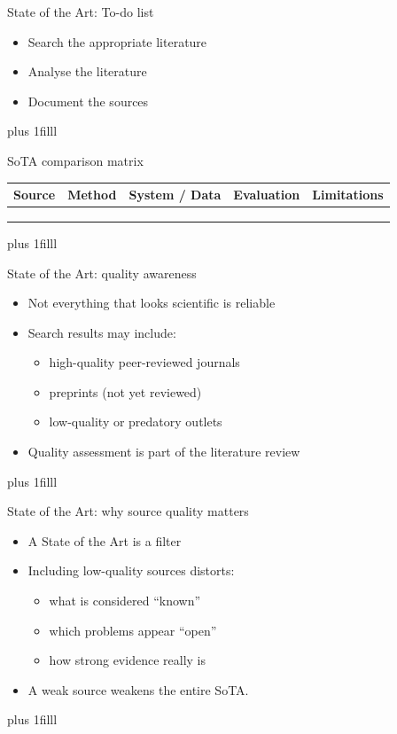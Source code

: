 \documentclass[aspectratio=169]{beamer}
\newcommand{\btVFill}{\vskip0pt plus 1filll}
\begin{document}
\begin{frame}{State of the Art: To-do list}
  \begin{itemize}
    \item Search the appropriate literature
    \item Analyse the literature
    \item Document the sources
  \end{itemize}
  \btVFill
\end{frame}

\begin{frame}{SoTA comparison matrix}
\small
\begin{tabular}{p{2.6cm} p{2.2cm} p{2.2cm} p{2.4cm} p{2.4cm}}
\toprule
\textbf{Source} &
\textbf{Method} &
\textbf{System / Data} &
\textbf{Evaluation} &
\textbf{Limitations} \\
\midrule
 &  &  &  &  \\
 &  &  &  &  \\
 &  &  &  &  \\
\bottomrule
\end{tabular}
\btVFill
\end{frame}

\begin{frame}{State of the Art: quality awareness}
  \begin{itemize}
    \item Not everything that looks scientific is reliable
    \item Search results may include:
      \begin{itemize}
        \item high-quality peer-reviewed journals
        \item preprints (not yet reviewed)
        \item low-quality or predatory outlets
      \end{itemize}
    \item Quality assessment is part of the literature review
  \end{itemize}
  \btVFill
\end{frame}

\begin{frame}{State of the Art: why source quality matters}
  \begin{itemize}
    \item A State of the Art is a filter
    \item Including low-quality sources distorts:
      \begin{itemize}
        \item what is considered ``known''
        \item which problems appear ``open''
        \item how strong evidence really is
      \end{itemize}
    \item A weak source weakens the entire SoTA.
  \end{itemize}

  \btVFill
\end{frame}
\end{document}
